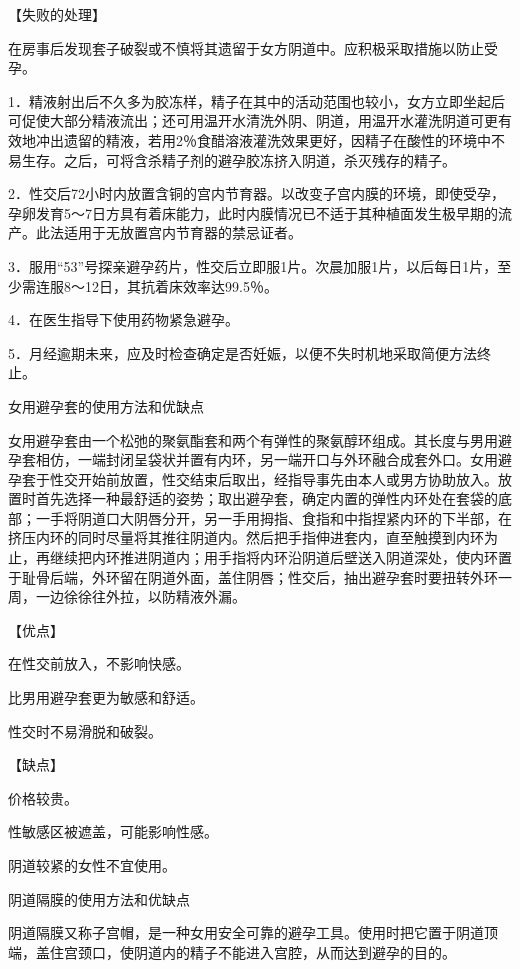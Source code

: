 \documentclass[12pt,UTF8,openany]{ctexbook}
\begin{document}
【失败的处理】

在房事后发现套子破裂或不慎将其遗留于女方阴道中。应积极采取措施以防止受孕。

1．精液射出后不久多为胶冻样，精子在其中的活动范围也较小，女方立即坐起后可促使大部分精液流出；还可用温开水清洗外阴、阴道，用温开水灌洗阴道可更有效地冲出遗留的精液，若用2％食醋溶液灌洗效果更好，因精子在酸性的环境中不易生存。之后，可将含杀精子剂的避孕胶冻挤入阴道，杀灭残存的精子。

2．性交后72小时内放置含铜的宫内节育器。以改变子宫内膜的环境，即使受孕，孕卵发育5～7日方具有着床能力，此时内膜情况已不适于其种植面发生极早期的流产。此法适用于无放置宫内节育器的禁忌证者。

3．服用“53”号探亲避孕药片，性交后立即服1片。次晨加服1片，以后每日1片，至少需连服8～12日，其抗着床效率达99.5％。

4．在医生指导下使用药物紧急避孕。

5．月经逾期未来，应及时检查确定是否妊娠，以便不失时机地采取简便方法终止。





女用避孕套的使用方法和优缺点


女用避孕套由一个松弛的聚氨酯套和两个有弹性的聚氨醇环组成。其长度与男用避孕套相仿，一端封闭呈袋状并置有内环，另一端开口与外环融合成套外口。女用避孕套于性交开始前放置，性交结束后取出，经指导事先由本人或男方协助放入。放置时首先选择一种最舒适的姿势；取出避孕套，确定内置的弹性内环处在套袋的底部；一手将阴道口大阴唇分开，另一手用拇指、食指和中指捏紧内环的下半部，在挤压内环的同时尽量将其推往阴道内。然后把手指伸进套内，直至触摸到内环为止，再继续把内环推进阴道内；用手指将内环沿阴道后壁送入阴道深处，使内环置于耻骨后端，外环留在阴道外面，盖住阴唇；性交后，抽出避孕套时要扭转外环一周，一边徐徐往外拉，以防精液外漏。

【优点】

在性交前放入，不影响快感。

比男用避孕套更为敏感和舒适。

性交时不易滑脱和破裂。

【缺点】

价格较贵。

性敏感区被遮盖，可能影响性感。

阴道较紧的女性不宜使用。





阴道隔膜的使用方法和优缺点


阴道隔膜又称子宫帽，是一种女用安全可靠的避孕工具。使用时把它置于阴道顶端，盖住宫颈口，使阴道内的精子不能进入宫腔，从而达到避孕的目的。
\end{document}
